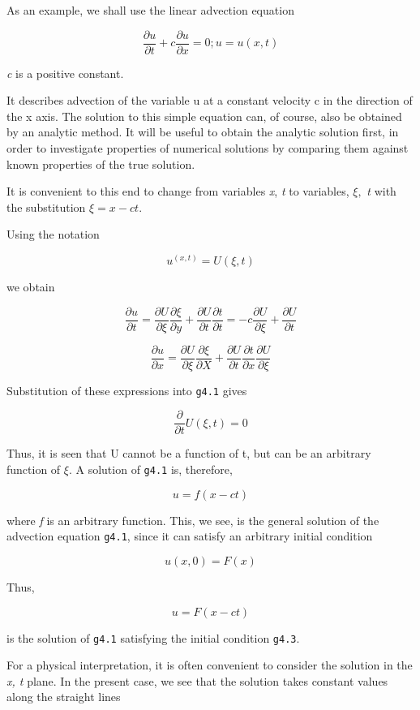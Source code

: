As an example, we shall use the linear advection equation

    {\[\frac{\partial u}{\partial t} +c\frac{\partial u}{\partial x } = 0; u =u(x,t)\]}

\emph{c} is a positive constant.

It describes advection of the variable u at a constant velocity c in the
direction of the x axis. The solution to this simple equation can, of
course, also be obtained by an analytic method. It will be useful to
obtain the analytic solution first, in order to investigate properties
of numerical solutions by comparing them against known properties of the
true solution.

It is convenient to this end to change from variables \emph{x}, \emph{t}
to variables, \(\xi,\) \emph{t} with the substitution \(\xi = x - ct\).

Using the notation

\[u^{(x,t)} = U (\xi, t)\]

we obtain

\[\frac{\partial u}{\partial t} = \frac{\partial U}{\partial\xi}\frac{\partial\xi}{\partial y} +
\frac{\partial U}{\partial t}\frac{\partial t}{\partial t} =-c\frac{\partial U}{\partial\xi}+
\frac{\partial U}{\partial t}\]

\[\frac{\partial u}{\partial x} =\frac{\partial U}{\partial\xi}\frac{\partial\xi}{\partial X}
+ \frac{\partial U}{\partial t}\frac{\partial t}{\partial x}\frac{\partial U}{\partial\xi}\]

Substitution of these expressions into \texttt{g4.1} gives

\[\frac{\partial}{\partial t}U(\xi,t) = 0\]

Thus, it is seen that U cannot be a function of t, but can be an
arbitrary function of \(\xi\). A solution of \texttt{g4.1} is,
therefore,

    {\[u = f(x - ct)\]}

where \emph{f} is an arbitrary function. This, we see, is the general
solution of the advection equation \texttt{g4.1}, since it can satisfy
an arbitrary initial condition

    {\[u(x,0) = F(x)\]}

Thus,

    {\[u = F \left( x - ct \right)\]}

is the solution of \texttt{g4.1} satisfying the initial condition
\texttt{g4.3}.

For a physical interpretation, it is often convenient to consider the
solution in the \emph{x, t} plane. In the present case, we see that the
solution takes constant values along the straight lines

